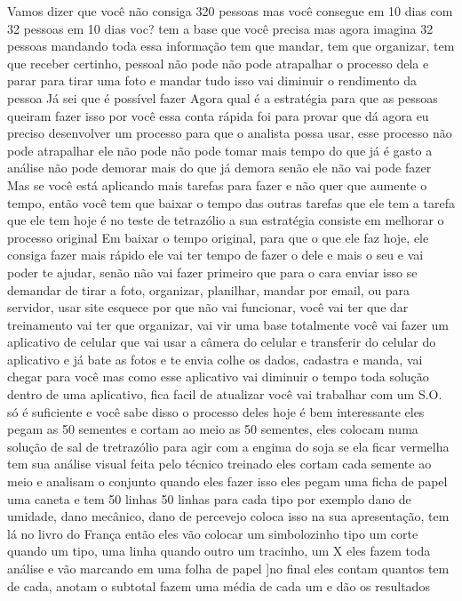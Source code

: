 Vamos dizer que você não consiga 320 pessoas
mas você consegue em 10 dias com 32 pessoas
em 10 dias voc? tem a base que você precisa
mas agora imagina 32 pessoas mandando toda essa informação
tem que mandar, tem que organizar, tem que receber certinho, pessoal não pode
não pode atrapalhar o processo dela
e parar para tirar uma foto e mandar tudo isso vai diminuir o rendimento da pessoa
Já sei que é possível fazer
Agora qual é a estratégia para que as pessoas queiram fazer isso por você
essa conta rápida foi para provar que dá
agora eu preciso
desenvolver um processo
para que o analista possa usar, esse processo não pode atrapalhar ele
não pode
não pode tomar mais tempo do que já é gasto
a análise não pode demorar mais do que já demora
senão ele não vai pode fazer
Mas se você está aplicando mais tarefas para fazer
e não quer que aumente o tempo, então
você tem que baixar o tempo das outras tarefas que ele tem
a tarefa que ele tem hoje é
no teste de tetrazólio
a sua estratégia consiste em melhorar o processo original
Em baixar o tempo original, para que
o que ele faz hoje, ele consiga fazer mais rápido
ele vai ter tempo de fazer o dele e mais o seu
e vai poder te ajudar, senão não vai fazer
primeiro que para o cara enviar isso
se demandar de tirar a foto, organizar, planilhar, mandar por email, ou para servidor, usar site
esquece por que não vai funcionar, você vai ter que dar treinamento
vai ter que organizar, vai vir uma base totalmente
você vai fazer um aplicativo de celular que vai usar a câmera do celular e transferir do celular
do aplicativo e já bate as fotos e te envia
colhe os dados, cadastra e manda, vai chegar para você
mas como esse aplicativo vai diminuir o tempo
toda solução dentro de uma aplicativo, fica facil de atualizar
você vai trabalhar com um S.O. só
é suficiente e você sabe disso
o processo deles hoje é bem interessante
eles pegam as 50 sementes e cortam ao meio
as 50 sementes, eles colocam numa solução
de sal de tretrazólio
para agir com a engima do soja
se ela ficar vermelha tem sua análise visual feita pelo técnico treinado
eles cortam cada semente ao meio e analisam o conjunto
quando eles fazer isso eles pegam uma ficha de papel
uma caneta
e tem 50 linhas
50 linhas para cada tipo
por exemplo
dano de umidade, dano mecânico, dano de percevejo
coloca isso na sua apresentação, tem lá no livro do França
então eles vão colocar um simbolozinho
tipo um corte quando um tipo, uma linha quando outro
um tracinho, um X
eles fazem toda análise e vão marcando em uma folha de papel
]no final eles contam
quantos tem de cada, anotam o subtotal
fazem uma média de cada um e dão os resultados
